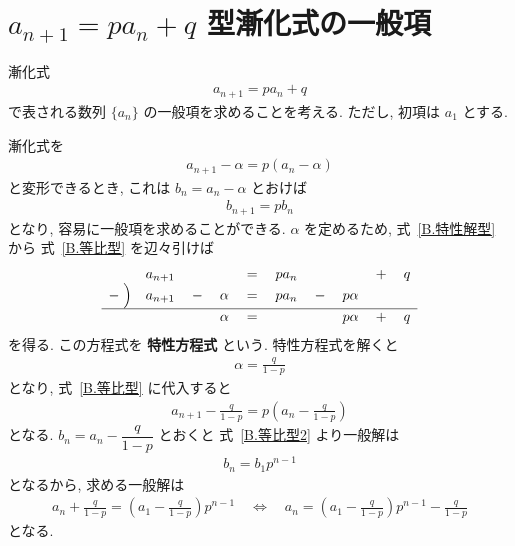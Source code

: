 
\section{$a_{n + 1} = pa_{n} + q$ 型漸化式の一般項}
\label{a_{n + 1} = pa_{n} + q 型漸化式の一般項}

漸化式
\begin{align}
	a_{n + 1} = pa_{n} + q \label{B.特性解型}
\end{align}
で表される数列 $\{a_{n}\}$ の一般項を求めることを考える.
ただし, 初項は $a_{1}$ とする.

\vspace{\baselineskip}
漸化式を
\begin{align}
	a_{n + 1} - \alpha = p(a_{n} - \alpha) \label{B.等比型}
\end{align}
と変形できるとき, これは $b_{n} = a_{n} - \alpha$ とおけば
\begin{align}
	b_{n + 1} = pb_{n} \label{B.等比型2}
\end{align}
となり, 容易に一般項を求めることができる.
$\alpha$ を定めるため, 式~\eqref{B.特性解型} から 式~\eqref{B.等比型} を辺々引けば
\begin{align}
	\begin{array}{cccccccccc}
		        & a_{n + 1} &       &        & {}={} & pa_{n} &       &         & {}+{} & q\\
		-\Bigm) & a_{n + 1} & {}-{} & \alpha & {}={} & pa_{n} & {}-{} & p\alpha &       &  \\ \hline
		        &           &       & \alpha & {}={} &        &       & p\alpha & {}+{} & q
	\end{array}
\end{align}
を得る.
この方程式を {\textbf{特性方程式}} という.
特性方程式を解くと
\begin{align}
	\alpha = \frac{q}{1-p}
\end{align}
となり, 式~\eqref{B.等比型} に代入すると
\begin{align}
	a_{n + 1} - \frac{q}{1 - p} = p\left(a_{n} - \frac{q}{1 - p}\right)
\end{align}
となる.
$b_{n} = a_{n} - \dfrac{q}{1 - p}$ とおくと 式~\eqref{B.等比型2} より一般解は
\begin{align}
	b_{n} = b_{1}p^{n - 1}
\end{align}
となるから, 求める一般解は
\begin{align}
	a_{n} + \frac{q}{1 - p} = \left(a_{1} - \frac{q}{1 - p}\right)p^{n - 1}
	\quad\Leftrightarrow\quad
	a_{n} = \left(a_{1} - \frac{q}{1 - p}\right)p^{n - 1} - \frac{q}{1 - p}
\end{align}
となる.